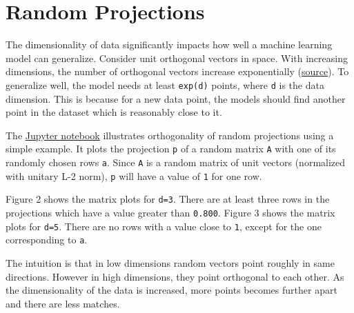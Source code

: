 \chapter{Random Projections}
The dimensionality of data significantly impacts how well a machine learning model can generalize.
Consider unit orthogonal vectors in space.
With increasing dimensions, the number of orthogonal vectors increase exponentially (\href{https://www.cs.princeton.edu/courses/archive/fall15/cos521/lecnotes/lec12.pdf}{source}).
To generalize well, the model needs at least \texttt{exp(d)} points, where \texttt{d} is the data dimension.
This is because for a new data point, the models should find another point in the dataset which is reasonably close to it. 

The \href{https://github.com/Atcold/pytorch-Deep-Learning-Minicourse/blob/master/extra/a-projections.ipynb}{Jupyter notebook} illustrates orthogonality of random projections using a simple example.
It plots the projection \texttt{p} of a random matrix \texttt{A} with one of its randomly chosen rows \texttt{a}.
Since \texttt{A} is a random matrix of unit vectors (normalized with unitary L-2 norm), \texttt{p} will have a value of \texttt{1} for one row. 

Figure 2 shows the matrix plots for \texttt{d=3}.
There are at least three rows in the projections which have a value greater than \texttt{0.800}.
Figure 3 shows the matrix plots for \texttt{d=5}.
There are no rows with a value close to \texttt{1}, except for the one corresponding to \texttt{a}.

The intuition is that in low dimensions random vectors point roughly in same directions.
However in high dimensions, they point orthogonal to each other.
As the dimensionality of the data is increased, more points becomes further apart and there are less matches.

